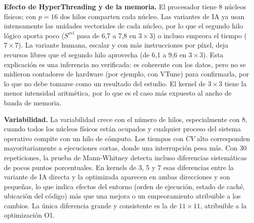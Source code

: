 \documentclass[12pt]{article}
\begin{document}
\textbf{Efecto de HyperThreading y de la memoria.} El procesador tiene 8 núcleos físicos; con $p = 16$ dos hilos comparten cada núcleo. Las variantes de IA ya usan intensamente las unidades vectoriales de cada núcleo, por lo que el segundo hilo lógico aporta poco ($S^{rel}$ pasa de 6,7 a 7,8 en $3\times3$) o incluso empeora el tiempo ($7\times7$). La variante humana, escalar y con más instrucciones por píxel, deja recursos libres que el segundo hilo aprovecha (de 6,1 a 9,6 en $3\times3$). Esta explicación es una inferencia no verificada: es coherente con los datos, pero no se midieron contadores de hardware (por ejemplo, con VTune) para confirmarla, por lo que no debe tomarse como un resultado del estudio. El kernel de $3\times3$ tiene la menor intensidad aritmética, por lo que es el caso más expuesto al ancho de banda de memoria.

\textbf{Variabilidad.} La variabilidad crece con el número de hilos, especialmente con 8, cuando todos los núcleos físicos están ocupados y cualquier proceso del sistema operativo compite con un hilo de cómputo. Los tiempos con $CV$ alto corresponden mayoritariamente a ejecuciones cortas, donde una interrupción pesa más. Con 30 repeticiones, la prueba de Mann-Whitney detecta incluso diferencias sistemáticas de pocos puntos porcentuales. En kernels de 3, 5 y 7 esas diferencias entre la variante de IA directa y la optimizada aparecen en ambas direcciones y son pequeñas, lo que indica efectos del entorno (orden de ejecución, estado de caché, ubicación del código) más que una mejora o un empeoramiento atribuible a los cambios. La única diferencia grande y consistente es la de $11\times11$, atribuible a la optimización O1.
\end{document}
